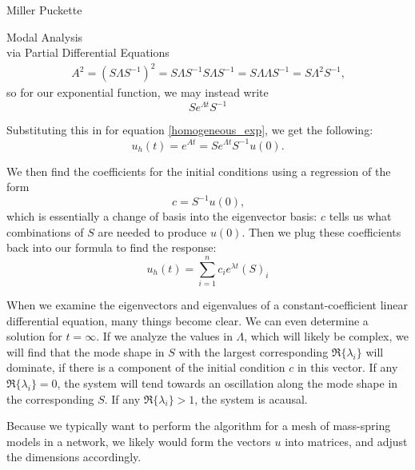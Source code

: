 \documentclass[a4paper,10pt]{report}
\numberwithin{equation}{section}
\begin{document}
\begin{chapter}{Miller Puckette}
\begin{section}{Modal Analysis \\via Partial Differential Equations}
\begin{align*}
A^2 = (S \Lambda S^{-1})^2
= S \Lambda S^{-1} S \Lambda S^{-1}
= S \Lambda \Lambda S^{-1}
= S \Lambda^2 S^{-1} \text{,}
\end{align*}
so for our exponential function, we may instead write
\begin{equation}
S e^{\Lambda t} S^{-1}
\end{equation}

Substituting this in for equation \eqref{homogeneous_exp}, we get the following:
\begin{equation}
u_h(t) = e^{At} = Se^{\Lambda t} S^{-1} u(0) \text{.}
\end{equation}

We then find the coefficients for the initial conditions using a regression of the form
\begin{equation}\label{coef_regression}
 c = S^{-1} u(0) \text{,} 
\end{equation}
which is essentially a change of basis into the eigenvector basis: $c$ tells us what combinations of $S$ are needed to produce $u(0)$. Then we plug these coefficients back into our formula to find the response:
\begin{equation}
 u_h(t) = \sum_{i=1}^n c_i e^{\lambda t} (S)_i
\end{equation}

When we examine the eigenvectors and eigenvalues of a constant-coefficient linear differential equation, many things become clear. We can even determine a solution for $t = \infty$. If we analyze the values in $\Lambda$, which will likely be complex, we will find that the mode shape in $S$ with the largest corresponding $\Re\{\lambda_i\}$ will dominate, if there is a component of the initial condition $c$ in this vector. If any $\Re\{\lambda_i\} = 0$, the system will tend towards an oscillation along the mode shape in the corresponding $S$. If any $\Re\{\lambda_i\} > 1$, the system is acausal. \cite[p.~318]{Strang2009}

Because we typically want to perform the algorithm for a mesh of mass-spring models in a network, we likely would form the vectors $u$ into matrices, and adjust the dimensions accordingly.\cite[p.~20]{Reid1992}


\end{section}
\end{chapter}
\end{document}
